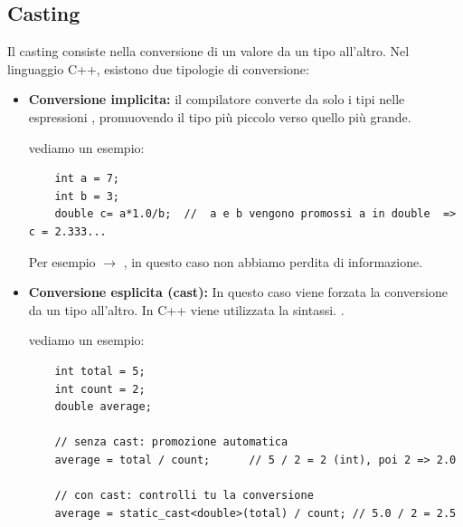 \subsection{Casting}
Il casting consiste nella conversione di un valore da un tipo all'altro. Nel linguaggio C++, esistono due tipologie di conversione: 

\begin{itemize}
    \item \textbf{Conversione implicita:} il compilatore converte da solo i tipi nelle espressioni , promuovendo il tipo più piccolo verso quello più grande.

    vediamo un esempio: 


\pagebreak

\begin{codeexample}
\begin{codebox}
\begin{lstlisting}
    int a = 7; 
    int b = 3; 
    double c= a*1.0/b;  //  a e b vengono promossi a in double  => c = 2.333...
\end{lstlisting}
\end{codebox}

\end{codeexample}


    Per esempio  $\rightarrow$ , in questo caso non abbiamo perdita di informazione.
    \item  \textbf{Conversione esplicita (cast):} In questo caso viene forzata la conversione da un tipo all'altro.  In C++ viene utilizzata la sintassi. . 

        vediamo un esempio: 
        \begin{codeexample}
        \begin{codebox}
    \begin{lstlisting}
    int total = 5;
    int count = 2;
    double average;

    // senza cast: promozione automatica
    average = total / count;      // 5 / 2 = 2 (int), poi 2 => 2.0

    // con cast: controlli tu la conversione
    average = static_cast<double>(total) / count; // 5.0 / 2 = 2.5
    \end{lstlisting}
    \end{codebox}

        \end{codeexample}


    
\end{itemize}


